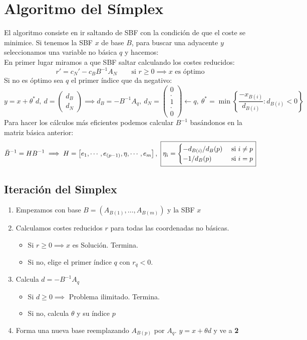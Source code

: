 \documentclass{myclass}
\begin{document}
\section{Algoritmo del Símplex}
El algoritmo consiste en ir saltando de SBF con la condición de que el coste se minimice. Si tenemos la SBF $x$ de base $B$, para buscar una adyacente $y$ seleccionamos una variable no básica $q$ y hacemos: \\
En primer lugar miramos a que SBF saltar calculando los costes reducidos:
$$
\boxed{r' = c_N' - c_BB^{-1}A_N} \qquad \text{si } r\geq 0 \implies x \text{ es óptimo}
$$
Si no es óptimo sea $q$ el primer índice que da negativo:
$$
y = x + \theta^*d, \
d = \begin{pmatrix}
d_B \\
d_N
\end{pmatrix} \implies 
\boxed{d_B = -B^{-1}A_q}, \ \boxed{d_N = \begin{pmatrix}
0 \\
. \\
1 \\
. \\
0 
\end{pmatrix} \leftarrow q}, \
\boxed{\theta^* = \min \left\lbrace\frac{-x_{B(i)}}{d_{B(i)}}:d_{B(i)}<0  \right\rbrace}
$$
Para hacer los cálculos más eficientes podemos calcular $B^{-1}$ basándonos en la matriz básica anterior:
$$
 \Bar{B}^{-1} = HB^{-1} \implies
H=\left[ e_1, \cdots, e_{(p-1)}, \eta, \cdots, e_m  \right], \ \boxed{\eta_i = \begin{cases}
    -d_{B(i)}/d_B(p) &\text{ si } i\neq p \\
    -1/d_B(p) &\text{ si } i = p
\end{cases}}
$$

\subsection{Iteración del Simplex}
\begin{enumerate}
    \item Empezamos con base $B = (A_{B(1)}, \ldots, A_{B(m)})$ y la SBF $x$
    \item Calculamos costes reducidos $r$ para todas las coordenadas no básicas.
    \begin{itemize}
        \item Si $r\geq 0 \implies x$ es Solución. Termina. 
        \item Si no, elige el primer índice $q$ con $r_q<0$. 
    \end{itemize}
    \item Calcula $d = -B^{-1}A_q$
    \begin{itemize}
        \item Si $d\geq 0 \implies $ Problema ilimitado. Termina.
        \item Si no, calcula $\theta$ y su índice $p$
    \end{itemize}
    \item Forma una nueva base reemplazando $A_{B(p)}$ por $A_q$. $y = x + \theta d$ y ve a \textbf{2}
\end{enumerate}
\end{document}
